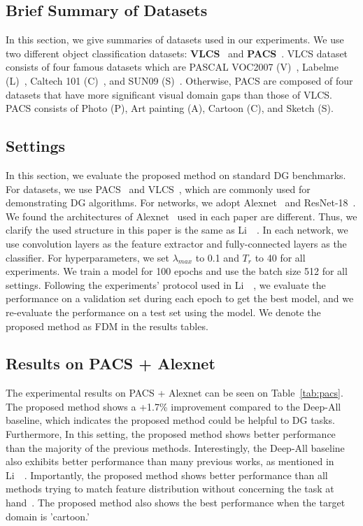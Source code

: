 \subsection{Brief Summary of Datasets}
In this section, we give summaries of datasets used in our experiments. We use two different object classification datasets: \textbf{VLCS}~\cite{chen2013vlcs} and \textbf{PACS}~\cite{Li2017dg}. VLCS dataset consists of four famous datasets which are PASCAL VOC2007 (V)~\cite{Everingham10}, Labelme (L)~\cite{labelme}, Caltech 101 (C)~\cite{Feifei2004caltech}, and SUN09 (S)~\cite{Choi2010sun09}. Otherwise, PACS are composed of four datasets that have more significant visual domain gaps than those of VLCS. PACS consists of Photo (P), Art painting (A), Cartoon (C), and Sketch (S).

\subsection{Settings}
In this section, we evaluate the proposed method on standard DG benchmarks. For datasets, we use PACS~\cite{Li2017dg} and VLCS~\cite{chen2013vlcs}, which are commonly used for demonstrating DG algorithms. For networks, we adopt Alexnet~\cite{Krizhevsky2012} and ResNet-18~\cite{He2016resnet}. We found the architectures of Alexnet~\cite{Krizhevsky2012} used in each paper are different. Thus, we clarify the used structure in this paper is the same as Li~\etal~\cite{li2019episodic}. In each network, we use convolution layers as the feature extractor and fully-connected layers as the classifier. For hyperparameters, we set $\lambda_{max}$ to 0.1 and $T_r$ to 40 for all experiments. We train a model for 100 epochs and use the batch size 512 for all settings. Following the experiments' protocol used in Li~\etal~\cite{Li2017dg}, we evaluate the performance on a validation set during each epoch to get the best model, and we re-evaluate the performance on a test set using the model. We denote the proposed method as FDM in the results tables.


\subsection{Results on PACS + Alexnet}
The experimental results on PACS + Alexnet can be seen on Table~\ref{tab:pacs}. The proposed method shows a +1.7\% improvement compared to the Deep-All baseline, which indicates the proposed method could be helpful to DG tasks. Furthermore, In this setting, the proposed method shows better performance than the majority of the previous methods. Interestingly, the Deep-All baseline also exhibits better performance than many previous works, as mentioned in Li~\etal~\cite{li2019episodic}. Importantly, the proposed method shows better performance than all methods trying to match feature distribution without concerning the task at hand~\cite{ghifary2015domain, ganin2016dann, muandet2013domaingeneralization}. The proposed method also shows the best performance when the target domain is 'cartoon.'

